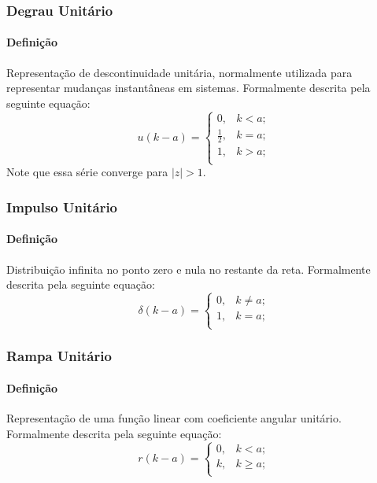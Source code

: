 \documentclass{article}
\begin{document}
\subsubsection{Degrau Unitário}
    \paragraph{Definição}Representação de descontinuidade unitária, normalmente utilizada para representar mudanças instantâneas em sistemas. Formalmente descrita pela seguinte equação:
    \begin{equation}
        \boxed{
            u(k - a) = 
            \begin{cases}
                0, & k < a;\\
                \frac{1}{2}, & k = a;\\
                1, & k > a;\\
            \end{cases}
        }
    \end{equation}
    Note que essa série converge para $|z| > 1$.

\subsubsection{Impulso Unitário}
    \paragraph{Definição}Distribuição infinita no ponto zero e nula no restante da reta. Formalmente descrita pela seguinte equação:
    \begin{equation}
        \boxed{
            \delta(k-a) = 
            \begin{cases}
                0, & k \neq a;\\
                1, & k = a;\\
            \end{cases}
            }
    \end{equation}

\subsubsection{Rampa Unitário}
    \paragraph{Definição}Representação de uma função linear com coeficiente angular unitário. Formalmente descrita pela seguinte equação:
    \begin{equation}
        \boxed{
            r(k - a) = 
            \begin{cases}
                0, & k < a;\\
                k, & k \ge a;\\
            \end{cases}
        }
    \end{equation}
\end{document}
